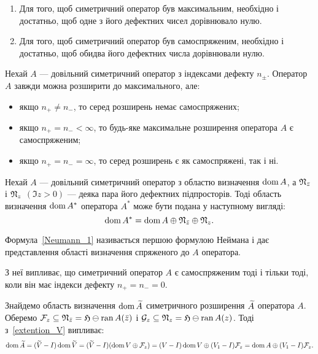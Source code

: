 \begin{theorem}
	\begin{enumerate}
		\item Для того, щоб симетричний оператор був максимальним, необхідно і достатньо, щоб одне з його дефектних чисел дорівнювало нулю. 
		\item Для того, щоб симетричний оператор був самоспряженим, необхідно і достатньо, щоб обидва його дефектних числа дорівнювали нулю. 
	\end{enumerate}
\end{theorem}

\begin{theorem}
	Нехай $A$ --- довільний симетричний оператор з індексами дефекту $n_\pm$. Оператор $A$ завжди можна розширити до максимального, але:
	\begin{itemize}
		\item якщо $n_+\ne n_-$, то серед розширень немає самоспряжених;
		\item якщо $n_+=n_-<\infty$, то будь-яке максимальне розширення оператора $A$ є самоспряженим;
		\item якщо $n_+=n_-=\infty$, то серед розширень є як самоспряжені, так і ні.
	\end{itemize}
\end{theorem}

\begin{theorem}
	Нехай $A$ --- довільний симетричний оператор з областю визначення $\operatorname{dom} A$, а $\mathfrak{N}_{\bar z}$ і $\mathfrak{N}_z$ $(\Im z > 0)$ --- деяка пара його дефектних підпросторів. Тоді область визначення $\operatorname{dom}{A^*}$ оператора $A^*$ може бути подана у наступному вигляді:
	\begin{equation} \label{Neumann_1}
		\operatorname{dom}{A^*} = \operatorname{dom}{A} \oplus \mathfrak{N}_{\bar z} \oplus \mathfrak{N}_z.
	\end{equation}
\end{theorem}

Формула~\eqref{Neumann_1} називається першою формулою Неймана і дає представлення області визначення спряженого до $A$ оператора.

З неї випливає, що симетричний оператор $A$ є самоспряженим тоді і тільки тоді, коли він має індекси дефекту $n_+=n_-=0$.

Знайдемо область визначення $\operatorname{dom}{\widetilde A}$ симетричного розширення $\widetilde A$ оператора $A$. Оберемо $\mathcal{F}_z \subseteq \mathfrak{N}_{\bar z} = \mathfrak{H} \ominus \operatorname{ran}{A(\bar z)}$ і $\mathcal{G}_z \subseteq \mathfrak{N}_{z} = \mathfrak{H} \ominus \operatorname{ran}{A(z)}$. Тоді з~\eqref{extention_V} випливає:
\begin{equation*}
 	\operatorname{dom}{\widetilde A} = (\widetilde V - I)\operatorname{dom}{\widetilde V} = (\widetilde V -I)(\operatorname{dom}{V} \oplus \mathcal{F}_z) = (V - I)\operatorname{dom}{V} \oplus (V_1 - I)\mathcal{F}_z = \operatorname{dom}{A} \oplus (V_1 - I)\mathcal{F}_z.
\end{equation*}

